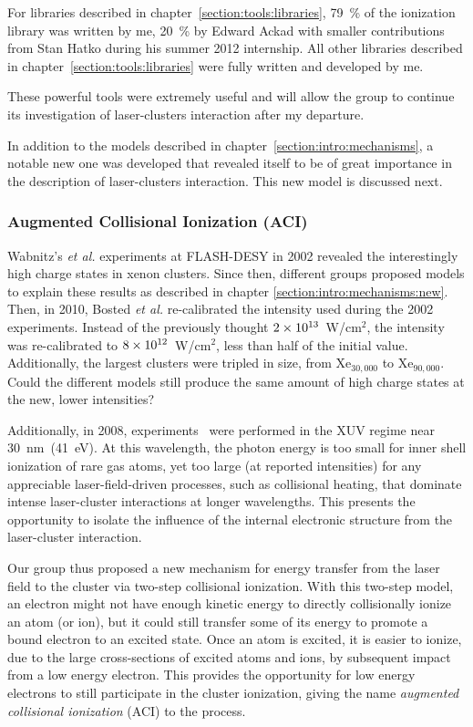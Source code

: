 For libraries described in chapter~\ref{section:tools:libraries}, 79~\% of the
ionization library was written by me, 20~\% by Edward Ackad with smaller
contributions from Stan Hatko during his summer 2012 internship. All other
libraries described in chapter~\ref{section:tools:libraries} were fully
written and developed by me.

These powerful tools were extremely useful and will allow
the group to continue its investigation of laser-clusters interaction
after my departure.

In addition to the models described in
chapter~\ref{section:intro:mechanisms}, a notable new one was
developed that revealed itself to be of great importance in the description of
laser-clusters interaction. This new model is discussed next.


\subsubsection{Augmented Collisional Ionization (ACI)}

Wabnitz's \textit{et al.} experiments at FLASH-DESY in 2002 revealed the
interestingly high charge states in xenon clusters. Since then, different groups
proposed models to explain these results as described in chapter
\ref{section:intro:mechanisms:new}.
Then, in 2010, Bosted \textit{et al.}
re-calibrated the intensity used during the 2002 experiments.
Instead of the previously thought $\ten{2}{13}$~W/cm$^2$, the intensity was
re-calibrated to $\ten{8}{12}$~W/cm$^2$, less than half of the initial value.
Additionally, the largest clusters were tripled in size, from Xe$_{30,000}$
to Xe$_{90,000}$.
Could the different models still produce the same amount of high charge states
at the new, lower intensities?

Additionally, in 2008, experiments~\cite{Bostedt2008,Murphy2008b} were performed
in the XUV regime near 30~nm~(41~eV). At this wavelength, the photon energy is
too small for inner shell ionization of rare gas atoms, yet too large
(at reported intensities) for any appreciable laser-field-driven processes, such
as collisional heating, that dominate intense laser-cluster interactions at
longer wavelengths. This presents the opportunity to isolate the influence of
the internal electronic structure from the laser-cluster interaction.

Our group thus proposed a new mechanism for energy transfer from the laser field
to the cluster via two-step collisional ionization. With this two-step model, an
electron might not have enough kinetic energy to directly collisionally ionize
an atom (or ion), but it could still transfer some of
its energy to promote a bound electron to an excited state. Once an atom is
excited, it is easier to ionize, due to the large cross-sections of excited
atoms and ions, by subsequent impact from a low energy electron. This provides the
opportunity for low energy electrons to still participate in the cluster
ionization, giving the name \textit{augmented collisional ionization} (ACI) to
the process.

